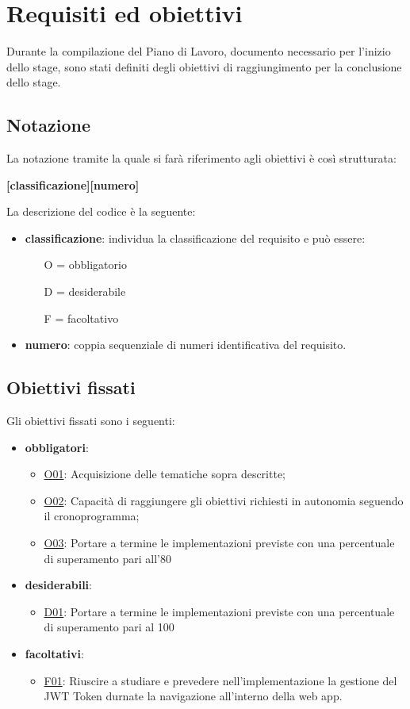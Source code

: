 \section{Requisiti ed obiettivi}
\label{sec:requisiti-obiettivi}
Durante la compilazione del Piano di Lavoro, documento necessario per l'inizio dello stage, sono stati definiti degli obiettivi di raggiungimento per la conclusione dello stage.

\subsection{Notazione}
\label{subsec:notazione}
La notazione tramite la quale si farà riferimento agli obiettivi è così strutturata:
\begin{center}
	\textbf{[classificazione][numero]}
\end{center}
La descrizione del codice è la seguente:
\begin{itemize}
	\item \textbf{classificazione}: individua la classificazione del requisito e può essere:
	\begin{itemize}
		\item [O =] obbligatorio
		\item [D =] desiderabile
		\item [F =] facoltativo
	\end{itemize}
\item \textbf{numero}: coppia sequenziale di numeri identificativa del requisito.
\end{itemize}
\subsection{Obiettivi fissati}
\label{subsec:obiettivi-fissati}
Gli obiettivi fissati sono i seguenti:
\begin{itemize}
	\item \textbf{obbligatori}:
	\begin{itemize}
		\item \underline{O01}: Acquisizione delle tematiche sopra descritte;
		\item \underline{O02}: Capacità di raggiungere gli obiettivi richiesti in autonomia seguendo il cronoprogramma;
		\item \underline{O03}: Portare a termine le implementazioni previste con una percentuale di superamento pari all'80%
	\end{itemize}
	\item \textbf{desiderabili}:
	\begin{itemize}
		\item \underline{D01}: Portare a termine le implementazioni previste con una percentuale di superamento pari al 100%
	\end{itemize}
	\item \textbf{facoltativi}:
	\begin{itemize}
		\item \underline{F01}: Riuscire a studiare e prevedere nell'implementazione la gestione del JWT Token durnate la navigazione all'interno della web app.
	\end{itemize}
\end{itemize}